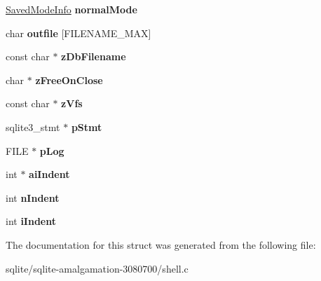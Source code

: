 \begin{DoxyCompactItemize}
\item 
\hypertarget{struct_shell_state_a14c5ad24e450653c49fe84cd5646ec4e}{\hyperlink{struct_saved_mode_info}{Saved\+Mode\+Info} {\bfseries normal\+Mode}}\label{struct_shell_state_a14c5ad24e450653c49fe84cd5646ec4e}

\item 
\hypertarget{struct_shell_state_ab1901d796d12c9fe4859f954fba74235}{char {\bfseries outfile} \mbox{[}F\+I\+L\+E\+N\+A\+M\+E\+\_\+\+M\+A\+X\mbox{]}}\label{struct_shell_state_ab1901d796d12c9fe4859f954fba74235}

\item 
\hypertarget{struct_shell_state_a8b887b0d2047997012969639cec7aec1}{const char $\ast$ {\bfseries z\+Db\+Filename}}\label{struct_shell_state_a8b887b0d2047997012969639cec7aec1}

\item 
\hypertarget{struct_shell_state_acd5673a65d8d4aa5a5a674e4ad8a374b}{char $\ast$ {\bfseries z\+Free\+On\+Close}}\label{struct_shell_state_acd5673a65d8d4aa5a5a674e4ad8a374b}

\item 
\hypertarget{struct_shell_state_a7a17ec105e801f6d466f3dd8e29521e6}{const char $\ast$ {\bfseries z\+Vfs}}\label{struct_shell_state_a7a17ec105e801f6d466f3dd8e29521e6}

\item 
\hypertarget{struct_shell_state_a443b930c7001c9b669728b917c2f5587}{sqlite3\+\_\+stmt $\ast$ {\bfseries p\+Stmt}}\label{struct_shell_state_a443b930c7001c9b669728b917c2f5587}

\item 
\hypertarget{struct_shell_state_a9ca42a0d7bf19e576de8ea13ba40b61c}{F\+I\+L\+E $\ast$ {\bfseries p\+Log}}\label{struct_shell_state_a9ca42a0d7bf19e576de8ea13ba40b61c}

\item 
\hypertarget{struct_shell_state_a0481fdd4a0c88fb17f1a66ba87939ce9}{int $\ast$ {\bfseries ai\+Indent}}\label{struct_shell_state_a0481fdd4a0c88fb17f1a66ba87939ce9}

\item 
\hypertarget{struct_shell_state_a73e3fe627474f4de6c0e04837ee0b0bd}{int {\bfseries n\+Indent}}\label{struct_shell_state_a73e3fe627474f4de6c0e04837ee0b0bd}

\item 
\hypertarget{struct_shell_state_a08d5d59ae0d44497aca79e89a5b8f0fe}{int {\bfseries i\+Indent}}\label{struct_shell_state_a08d5d59ae0d44497aca79e89a5b8f0fe}

\end{DoxyCompactItemize}


The documentation for this struct was generated from the following file\+:\begin{DoxyCompactItemize}
\item 
sqlite/sqlite-\/amalgamation-\/3080700/shell.\+c\end{DoxyCompactItemize}
